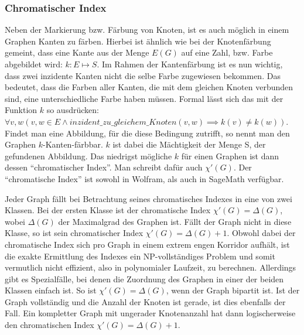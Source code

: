 \documentclass[a4paper,12pt,ngerman,chapterprefix=false,listof=totoc,bibliography=totoc]{scrreprt}
\begin{document}
\subsubsection*{Chromatischer Index}
{
Neben der Markierung bzw. Färbung von Knoten, ist es auch möglich in einem Graphen Kanten zu färben. Hierbei ist ähnlich wie bei der Knotenfärbung gemeint, dass eine Kante aus der Menge \(E(G)\) auf eine Zahl, bzw. Farbe abgebildet wird: \(k: E\mapsto S\). Im Rahmen der Kantenfärbung ist es nun wichtig, dass zwei inzidente Kanten nicht die selbe Farbe zugewiesen bekommen. Das bedeutet, dass die Farben aller Kanten, die mit dem gleichen Knoten verbunden sind, eine unterschiedliche Farbe haben müssen. Formal lässt sich das mit der Funktion \(k\) so ausdrücken: \(\forall v,w(v,w\in E \land inzident\_zu\_gleichem\_Knoten(v,w)\implies k(v)\neq k(w))\). Findet man eine Abbildung, für die diese Bedingung zutrifft, so nennt man den Graphen \(k\)-Kanten-färbbar. \(k\) ist dabei die Mächtigkeit der Menge S, der gefundenen Abbildung. Das niedrigst mögliche \(k\) für einen Graphen ist dann dessen "`chromatischer Index"'. Man schreibt dafür auch \(\chi '(G)\). Der "`chromatische Index"' ist sowohl in Wolfram, als auch in SageMath verfügbar. \cite{andersen_edge-colorings_1977,sagemath_graph_2020-1,wolfram_wolfram_2020-1}

Jeder Graph fällt bei Betrachtung seines chromatisches Indexes in eine von zwei Klassen. Bei der ersten Klasse ist der chromatische Index \(\chi '(G)=\Delta(G)\), wobei \(\Delta(G)\) der Maximalgrad des Graphen ist. Fällt der Graph nicht in diese Klasse, so ist sein chromatischer Index \(\chi '(G)=\Delta(G)+1\). Obwohl dabei der chromatische Index sich pro Graph in einem extrem engen Korridor aufhält, ist die exakte Ermittlung des Indexes ein NP-vollständiges Problem und somit vermutlich nicht effizient, also in polynomialer Laufzeit, zu berechnen. Allerdings gibt es Spezialfälle, bei denen die Zuordnung des Graphen in einer der beiden Klassen einfach ist. So ist \(\chi '(G)=\Delta(G)\), wenn der Graph bipartit ist. Ist der Graph vollständig und die Anzahl der Knoten ist gerade, ist dies ebenfalls der Fall. Ein kompletter Graph mit ungerader Knotenanzahl hat dann logischerweise den chromatischen Index \(\chi '(G)=\Delta(G)+1\). \cite{plantholt_chromatic_1983}

}
\end{document}
